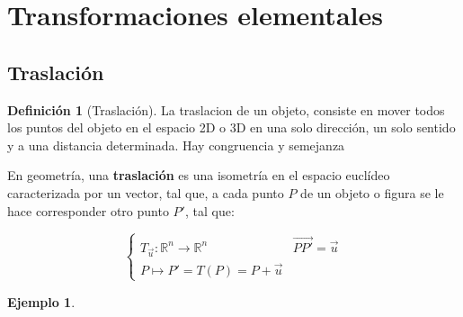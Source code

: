 \documentclass[16pt,]{krantz}
\theoremstyle{definition}
\newtheorem{definition}{Definición}[chapter]
\theoremstyle{definition}
\newtheorem{example}{Ejemplo}[chapter]
\theoremstyle{definition}
\theoremstyle{definition}
\theoremstyle{remark}
\begin{document}
\hypertarget{transformaciones-elementales}{%
\section{Transformaciones elementales}\label{transformaciones-elementales}}

\hypertarget{traslaciuxf3n}{%
\subsection{Traslación}\label{traslaciuxf3n}}

\begin{definition}[Traslación]
\protect\hypertarget{def:traslacion}{}{\label{def:traslacion} {} }La traslacion de un objeto, consiste en mover todos los puntos del objeto en el espacio 2D o 3D en una solo dirección, un solo sentido y a una distancia determinada. Hay congruencia y semejanza
\end{definition}

En geometría, una \textbf{traslación} es una isometría en el espacio euclídeo caracterizada por un vector, tal que, a cada punto \(P\) de un objeto o figura se le hace corresponder otro punto \(P'\), tal que:

\[
\begin{cases}T_{\vec {u}}:\mathbb {R} ^{n}\to \mathbb {R} ^{n}&{\overrightarrow {PP'}}={\vec {u}}\\P\mapsto P'=T(P)=P+{\vec {u}}\end{cases}
\]

\begin{example}
\protect\hypertarget{exm:unnamed-chunk-3}{}{\label{exm:unnamed-chunk-3} }
\end{example}
\end{document}
